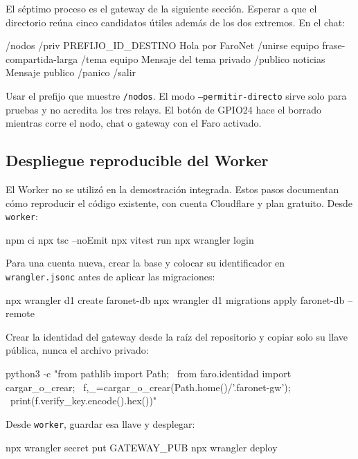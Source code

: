 \documentclass[11pt,letterpaper]{article}
\begin{document}
El séptimo proceso es el gateway de la siguiente sección. Esperar a que el
directorio reúna cinco candidatos útiles además de los dos extremos. En el chat:

\begin{codigo}
/nodos
/priv PREFIJO_ID_DESTINO Hola por FaroNet
/unirse equipo frase-compartida-larga
/tema equipo Mensaje del tema privado
/publico noticias Mensaje publico
/panico
/salir
\end{codigo}

Usar el prefijo que muestre \texttt{/nodos}. El modo \texttt{--permitir-directo}
sirve solo para pruebas y no acredita los tres relays. El botón de GPIO24 hace el
borrado mientras corre el nodo, chat o gateway con el Faro activado.

\subsection{Despliegue reproducible del Worker}

El Worker no se utilizó en la demostración integrada. Estos pasos documentan
cómo reproducir el código existente, con cuenta Cloudflare y plan gratuito.
Desde \texttt{worker}:

\begin{codigo}
npm ci
npx tsc --noEmit
npx vitest run
npx wrangler login
\end{codigo}

Para una cuenta nueva, crear la base y colocar su identificador en
\texttt{wrangler.jsonc} antes de aplicar las migraciones:

\begin{codigo}
npx wrangler d1 create faronet-db
npx wrangler d1 migrations apply faronet-db --remote
\end{codigo}

Crear la identidad del gateway desde la raíz del repositorio y copiar solo su
llave pública, nunca el archivo privado:

\begin{codigo}
python3 -c "from pathlib import Path; \
from faro.identidad import cargar_o_crear; \
f,_=cargar_o_crear(Path.home()/'.faronet-gw'); \
print(f.verify_key.encode().hex())"
\end{codigo}

Desde \texttt{worker}, guardar esa llave y desplegar:

\begin{codigo}
npx wrangler secret put GATEWAY_PUB
npx wrangler deploy
\end{codigo}
\end{document}
